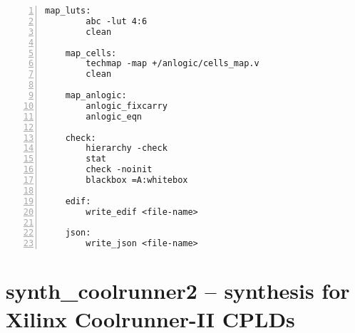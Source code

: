 \begin{lstlisting}[numbers=left,frame=single]
    map_luts:
        abc -lut 4:6
        clean

    map_cells:
        techmap -map +/anlogic/cells_map.v
        clean

    map_anlogic:
        anlogic_fixcarry
        anlogic_eqn

    check:
        hierarchy -check
        stat
        check -noinit
        blackbox =A:whitebox

    edif:
        write_edif <file-name>

    json:
        write_json <file-name>
\end{lstlisting}

\section{synth\_coolrunner2 -- synthesis for Xilinx Coolrunner-II CPLDs}
\label{cmd:synth_coolrunner2}
